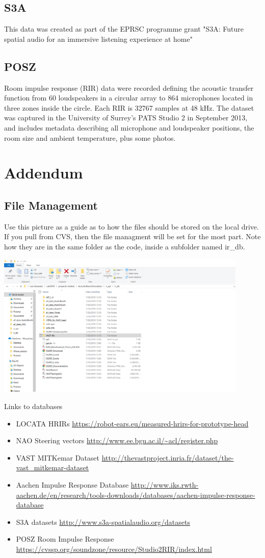 \documentclass{article}
\begin{document}
\subsection{S3A}
This data was created as part of the EPRSC programme grant "S3A: Future spatial audio for an immersive listening experience at home"
\subsection{POSZ}
Room impulse response (RIR) data were recorded defining the acoustic transfer function from 60 loudspeakers in a circular array to 864 microphones located in three zones inside the circle. Each RIR is 32767 samples at 48 kHz. The dataset was captured in the University of Surrey's PATS Studio 2 in September 2013, and includes metadata describing all microphone and loudspeaker positions, the room size and ambient temperature, plus some photos.

\section{Addendum}
\subsection{File Management}
Use this picture as a guide as to how the files should be stored on the local drive. If you pull from CVS, then the file managment will be set for the most part. Note how they are in the same folder as the code, inside a subfolder named ir\_db.


\includegraphics[width=0.9\textwidth]{filegestion.png}


Links to databases
\begin{itemize}
    \item LOCATA HRIRs \url{https://robot-ears.eu/measured-hrirs-for-prototype-head}
    \item NAO Steering vectors \url{http://www.ee.bgu.ac.il/~acl/register.php}
    \item VAST MITKemar Dataset \url{http://thevastproject.inria.fr/dataset/the-vast_mitkemar-dataset}
    \item Aachen Impulse Response Database \url{http://www.iks.rwth-aachen.de/en/research/tools-downloads/databases/aachen-impulse-response-database}
    \item S3A datasets \url{http://www.s3a-spatialaudio.org/datasets}
    \item POSZ Room Impulse Response \url{https://cvssp.org/soundzone/resource/Studio2RIR/index.html}
\end{itemize}
\end{document}

